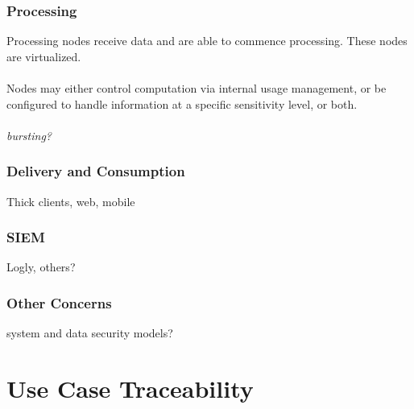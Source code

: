 \documentclass[t,handout]{beamer}
\begin{document}
\begin{frame}
\frametitle{Processing}
Processing nodes receive data and are able to commence processing.  These nodes are virtualized.  \\~\\

Nodes may either control computation via internal usage management, or be configured to handle information at a specific sensitivity level, or both. \\~\\

{\sl bursting?}
\end{frame}

\begin{frame}
\frametitle{Delivery and Consumption}
Thick clients, web, mobile
\end{frame}

\begin{frame}
\frametitle{SIEM}
Logly, others?
\end{frame}

\begin{frame}
\frametitle{Other Concerns}
system and data security models?
\end{frame}

\section{Use Case Traceability}

\end{document}
